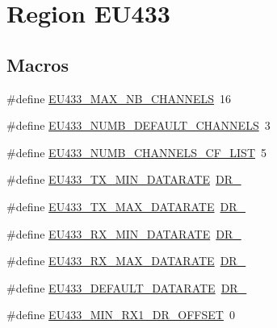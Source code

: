 \hypertarget{group__REGIONEU433}{}\section{Region E\+U433}
\label{group__REGIONEU433}
\subsection*{Macros}
\begin{DoxyCompactItemize}
\item 
\#define \hyperlink{group__REGIONEU433_ga800fbd07b871c93758364a0311b87937}{E\+U433\+\_\+\+M\+A\+X\+\_\+\+N\+B\+\_\+\+C\+H\+A\+N\+N\+E\+LS}~16
\item 
\#define \hyperlink{group__REGIONEU433_ga5458d9fd6043a733e6a28f5f30ace167}{E\+U433\+\_\+\+N\+U\+M\+B\+\_\+\+D\+E\+F\+A\+U\+L\+T\+\_\+\+C\+H\+A\+N\+N\+E\+LS}~3
\item 
\#define \hyperlink{group__REGIONEU433_ga97fb06ddf8a39eba531d145336aa7b5f}{E\+U433\+\_\+\+N\+U\+M\+B\+\_\+\+C\+H\+A\+N\+N\+E\+L\+S\+\_\+\+C\+F\+\_\+\+L\+I\+ST}~5
\item 
\#define \hyperlink{group__REGIONEU433_ga800fe5b0107ad06f0938c226022b436b}{E\+U433\+\_\+\+T\+X\+\_\+\+M\+I\+N\+\_\+\+D\+A\+T\+A\+R\+A\+TE}~\hyperlink{group__REGION_ga6c4ef966b4f3d5eb7597b087f2b97095}{D\+R\+\_}
\item 
\#define \hyperlink{group__REGIONEU433_gab53c26fec08fdd51e56cb0c4344f3fe9}{E\+U433\+\_\+\+T\+X\+\_\+\+M\+A\+X\+\_\+\+D\+A\+T\+A\+R\+A\+TE}~\hyperlink{group__REGION_ga3a06805baf4f00911a3a5d3dbadebf61}{D\+R\+\_}
\item 
\#define \hyperlink{group__REGIONEU433_ga895971124c9b602ce25f611d37df78a3}{E\+U433\+\_\+\+R\+X\+\_\+\+M\+I\+N\+\_\+\+D\+A\+T\+A\+R\+A\+TE}~\hyperlink{group__REGION_ga6c4ef966b4f3d5eb7597b087f2b97095}{D\+R\+\_}
\item 
\#define \hyperlink{group__REGIONEU433_ga565b799e9b0922806ddf14fa8518a51b}{E\+U433\+\_\+\+R\+X\+\_\+\+M\+A\+X\+\_\+\+D\+A\+T\+A\+R\+A\+TE}~\hyperlink{group__REGION_ga3a06805baf4f00911a3a5d3dbadebf61}{D\+R\+\_}
\item 
\#define \hyperlink{group__REGIONEU433_gaef579f3b753e8be08c36bd3da13a75a8}{E\+U433\+\_\+\+D\+E\+F\+A\+U\+L\+T\+\_\+\+D\+A\+T\+A\+R\+A\+TE}~\hyperlink{group__REGION_ga6c4ef966b4f3d5eb7597b087f2b97095}{D\+R\+\_}
\item 
\#define \hyperlink{group__REGIONEU433_gad92faa53973ac3aae8a74d648c474291}{E\+U433\+\_\+\+M\+I\+N\+\_\+\+R\+X1\+\_\+\+D\+R\+\_\+\+O\+F\+F\+S\+ET}~0

\end{DoxyCompactItemize}
